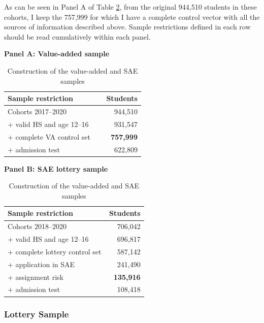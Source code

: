 \documentclass[a4paper, article, english, oneside, unknownkeysallowed, 12pt]{memoir}
\begin{document}
As can be seen in Panel A of Table \ref{tab:data-samples}, from the original 944,510 students in these cohorts, 
I keep the 757,999 for which I have a complete control vector with all the sources of information described above. 
Sample restrictions defined in each row should be read cumulatively within each panel.



\begin{table}[H]
\centering
\caption{Construction of the value-added and SAE samples}
\label{tab:data-samples}
\begin{minipage}[t]{0.48\textwidth}
\centering
\textbf{Panel A: Value-added sample}\\[0.4em]
\begin{tabular}{@{}p{0.72\linewidth}r@{}}
\toprule
Sample restriction & Students \\
\midrule
Cohorts 2017--2020 & 944,510 \\
+ valid HS and age 12--16 & 931,547 \\
+ complete VA control set & \textbf{757,999} \\
+ admission test & 622,809 \\
\bottomrule
\end{tabular}
\end{minipage}
\hfill
\begin{minipage}[t]{0.48\textwidth}
\centering
\textbf{Panel B: SAE lottery sample}\\[0.4em]
\begin{tabular}{@{}p{0.72\linewidth}r@{}}
\toprule
Sample restriction & Students \\
\midrule
Cohorts 2018--2020 & 706,042 \\
+ valid HS and age 12--16 & 696,817 \\
+ complete lottery control set & 587,142 \\
+ application in SAE & 241,490 \\
+ assignment risk & \textbf{135,916} \\
+ admission test & 108,418 \\
\bottomrule
\end{tabular}
\end{minipage}
\end{table}



\subsubsection{Lottery Sample}
\end{document}
